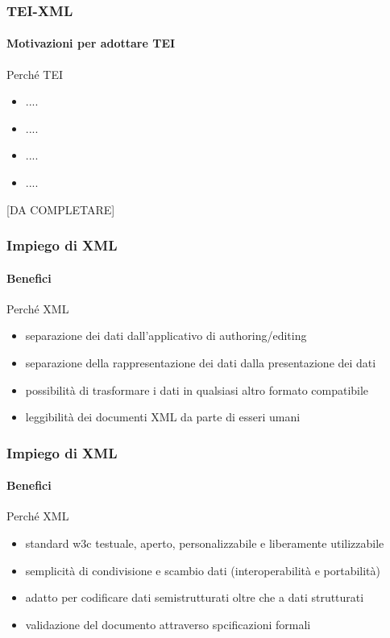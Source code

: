 \begin{frame}
	\frametitle{TEI-XML}
	\framesubtitle{Motivazioni per adottare TEI}
	\addtocounter{nframe}{1}

	\begin{block}{Perché TEI}
		\begin{itemize}
			\item ....
			\item ....
			\item ....
			\item ....
		\end{itemize}

	\end{block}

	[DA COMPLETARE]

	
\end{frame}

\begin{frame}
	\frametitle{Impiego di XML}
	\framesubtitle{Benefici}
	\addtocounter{nframe}{1}

	\begin{block}{Perché XML}
		\begin{itemize}
			\item separazione dei dati dall'applicativo di authoring/editing 
			\item separazione della rappresentazione dei dati dalla presentazione dei dati
			\item possibilità di trasformare i dati in qualsiasi altro formato compatibile
			\item leggibilità dei documenti XML da parte di esseri umani
		\end{itemize}

	\end{block}
	

\end{frame}

\begin{frame}
	\frametitle{Impiego di XML}
	\framesubtitle{Benefici}
	\addtocounter{nframe}{1}

	\begin{block}{Perché XML}
		\begin{itemize}
			\item standard w3c testuale, aperto, personalizzabile e liberamente utilizzabile
			\item semplicità di condivisione e scambio dati (interoperabilità e portabilità)
			\item adatto per codificare dati semistrutturati oltre che a dati strutturati
			\item validazione del documento attraverso spcificazioni formali
		\end{itemize}

	\end{block}
	

\end{frame}


